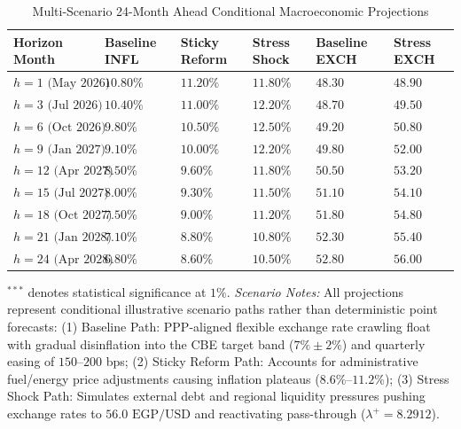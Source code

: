 \documentclass[review,12pt]{elsarticle}
\begin{document}
\begin{table}[H]
\centering
\footnotesize
\renewcommand{\arraystretch}{0.98}
\caption{Multi-Scenario 24-Month Ahead Conditional Macroeconomic Projections}
\label{tab:app_forecasts}
\begin{threeparttable}
\begin{tabularx}{\textwidth}{l YYYYY}
\toprule
\textbf{Horizon Month} & \textbf{Baseline INFL} & \textbf{Sticky Reform} & \textbf{Stress Shock} & \textbf{Baseline EXCH} & \textbf{Stress EXCH} \\
\midrule
$h=1\text{ (May 2026)}$ & $10.80\%$ & $11.20\%$ & $11.80\%$ & $48.30$ & $48.90$ \\
$h=3\text{ (Jul 2026)}$ & $10.40\%$ & $11.00\%$ & $12.20\%$ & $48.70$ & $49.50$ \\
$h=6\text{ (Oct 2026)}$ & $9.80\%$ & $10.50\%$ & $12.50\%$ & $49.20$ & $50.80$ \\
$h=9\text{ (Jan 2027)}$ & $9.10\%$ & $10.00\%$ & $12.20\%$ & $49.80$ & $52.00$ \\
$h=12\text{ (Apr 2027)}$ & $8.50\%$ & $9.60\%$ & $11.80\%$ & $50.50$ & $53.20$ \\
$h=15\text{ (Jul 2027)}$ & $8.00\%$ & $9.30\%$ & $11.50\%$ & $51.10$ & $54.10$ \\
$h=18\text{ (Oct 2027)}$ & $7.50\%$ & $9.00\%$ & $11.20\%$ & $51.80$ & $54.80$ \\
$h=21\text{ (Jan 2028)}$ & $7.10\%$ & $8.80\%$ & $10.80\%$ & $52.30$ & $55.40$ \\
$h=24\text{ (Apr 2028)}$ & $6.80\%$ & $8.60\%$ & $10.50\%$ & $52.80$ & $56.00$ \\
\bottomrule
\end{tabularx}
\begin{tablenotes}
\footnotesize
\item $^{***}$ denotes statistical significance at $1\%$. \textit{Scenario Notes:} All projections represent conditional illustrative scenario paths rather than deterministic point forecasts: (1) Baseline Path: PPP-aligned flexible exchange rate crawling float with gradual disinflation into the CBE target band ($7\% \pm 2\%$) and quarterly easing of $150$--$200$ bps; (2) Sticky Reform Path: Accounts for administrative fuel/energy price adjustments causing inflation plateaus ($8.6\%$--$11.2\%$); (3) Stress Shock Path: Simulates external debt and regional liquidity pressures pushing exchange rates to $56.0\text{ EGP/USD}$ and reactivating pass-through ($\lambda^+ = 8.2912$).
\end{tablenotes}
\end{threeparttable}
\end{table}
\end{document}

